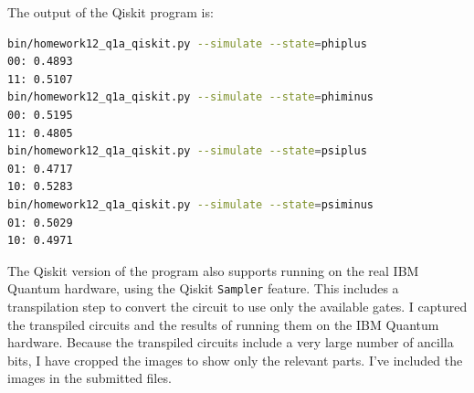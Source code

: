 \documentclass[12pt]{extarticle}
\begin{document}
\begin{enumerate}[(a)]
The output of the Qiskit program is:
\begin{lstlisting}[language=bash]
bin/homework12_q1a_qiskit.py --simulate --state=phiplus
00: 0.4893
11: 0.5107
bin/homework12_q1a_qiskit.py --simulate --state=phiminus
00: 0.5195
11: 0.4805
bin/homework12_q1a_qiskit.py --simulate --state=psiplus
01: 0.4717
10: 0.5283
bin/homework12_q1a_qiskit.py --simulate --state=psiminus
01: 0.5029
10: 0.4971
\end{lstlisting}














The Qiskit version of the program also supports running on the real IBM Quantum hardware, using the Qiskit \texttt{Sampler} feature.
This includes a transpilation step to convert the circuit to use only the available gates.
I captured the transpiled circuits and the results of running them on the IBM Quantum hardware.
Because the transpiled circuits include a very large number of ancilla bits, I have cropped the images to show only the relevant parts.
I've included the images in the submitted files.


\end{enumerate}
\end{document}
